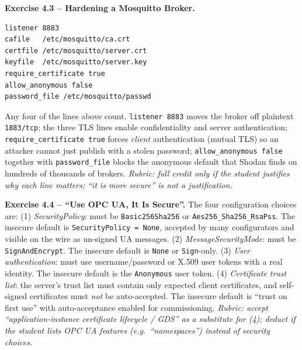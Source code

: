 \documentclass[11pt,a4paper]{article}
\begin{document}
\begin{solutionbox}
\textbf{Exercise 4.3 -- Hardening a Mosquitto Broker.}
\begin{verbatim}
listener 8883
cafile   /etc/mosquitto/ca.crt
certfile /etc/mosquitto/server.crt
keyfile  /etc/mosquitto/server.key
require_certificate true
allow_anonymous false
password_file /etc/mosquitto/passwd
\end{verbatim}
Any four of the lines above count. \texttt{listener 8883} moves the broker
off plaintext \texttt{1883/tcp}; the three TLS lines enable confidentiality
and server authentication; \texttt{require\_certificate true} forces
\emph{client} authentication (mutual TLS) so an attacker cannot just publish
with a stolen password; \texttt{allow\_anonymous false} together with
\texttt{password\_file} blocks the anonymous default that Shodan finds on
hundreds of thousands of brokers.
\textit{Rubric: full credit only if the student justifies why each line
matters; ``it is more secure'' is not a justification.}
\end{solutionbox}

\begin{solutionbox}
\textbf{Exercise 4.4 -- ``Use OPC UA, It Is Secure''.}
The four configuration choices are:
(1) \emph{SecurityPolicy}: must be \texttt{Basic256Sha256} or
\texttt{Aes256\_Sha256\_RsaPss}. The insecure default is
\texttt{SecurityPolicy = None}, accepted by many configurators and visible
on the wire as un-signed UA messages.
(2) \emph{MessageSecurityMode}: must be \texttt{SignAndEncrypt}. The
insecure default is \texttt{None} or \texttt{Sign}-only.
(3) \emph{User authentication}: must use username/password or X.509 user
tokens with a real identity. The insecure default is the
\texttt{Anonymous} user token.
(4) \emph{Certificate trust list}: the server's trust list must contain only
expected client certificates, and self-signed certificates must \emph{not}
be auto-accepted. The insecure default is ``trust on first use'' with
auto-acceptance enabled for commissioning.
\textit{Rubric: accept ``application-instance certificate lifecycle / GDS''
as a substitute for (4); deduct if the student lists OPC UA features
(e.g.\ ``namespaces'') instead of security choices.}
\end{solutionbox}
\end{document}
